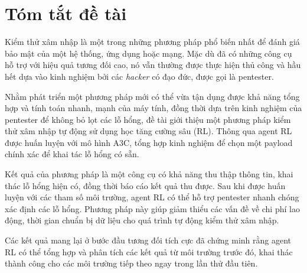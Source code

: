 \chapter*{\centering\Large{Tóm tắt đề tài}}
Kiểm thử xâm nhập là một trong những phương pháp phổ biến nhất để đánh giá bảo mật của một hệ thống, ứng dụng hoặc mạng. Mặc dù đã có những công cụ hỗ trợ với hiệu quả tương đối cao, nó vẫn thường được thực hiện thủ công và hầu hết dựa vào kinh nghiệm bởi các \textit{hacker} có đạo đức, được gọi là pentester. 

Nhằm phát triển một phương pháp mới có thể vừa tận dụng được khả năng tổng hợp và tính toán nhanh, mạnh của máy tính, đồng thời dựa trên kinh nghiệm của pentester để không bỏ lọt các lỗ hổng, đề tài giới thiệu một phương pháp kiểm thử xâm nhập tự động sử dụng học tăng cường sâu (RL). Thông qua agent RL được huấn luyện với mô hình A3C, tổng hợp kinh nghiệm để chọn một 
payload chính xác để khai tác lỗ hổng có sẵn.

Kết quả của phương pháp là một công cụ có khả năng thu thập thông tin, khai thác lỗ hổng hiện có, đồng thời báo cáo kết quả thu được. Sau khi được huấn luyện với các tham số môi trường, agent RL có thể hỗ trợ pentester nhanh chóng xác định các lỗ hổng. Phương pháp này giúp giảm thiểu các vấn đề về chi phí lao động, thời gian chuẩn bị dữ liệu cho quá trình tự động kiểm thử xâm nhập.

Các kết quả mang lại ở bước đầu tương đối tích cực đã chứng minh rằng agent RL có thể tổng hợp và phân tích các kết quả từ môi trường trước đó, khai thác thành công cho các môi trường tiếp theo ngay trong lần thử đầu tiên.




